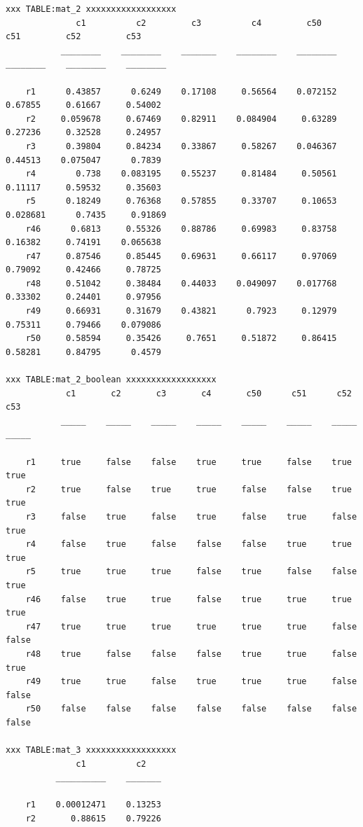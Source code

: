 \documentclass[
]{book}
\begin{document}
\begin{verbatim}
xxx TABLE:mat_2 xxxxxxxxxxxxxxxxxx
              c1          c2         c3          c4         c50         c51         c52         c53   
           ________    ________    _______    ________    ________    ________    ________    ________

    r1      0.43857      0.6249    0.17108     0.56564    0.072152     0.67855     0.61667     0.54002
    r2     0.059678     0.67469    0.82911    0.084904     0.63289     0.27236     0.32528     0.24957
    r3      0.39804     0.84234    0.33867     0.58267    0.046367     0.44513    0.075047      0.7839
    r4        0.738    0.083195    0.55237     0.81484     0.50561     0.11117     0.59532     0.35603
    r5      0.18249     0.76368    0.57855     0.33707     0.10653    0.028681      0.7435     0.91869
    r46      0.6813     0.55326    0.88786     0.69983     0.83758     0.16382     0.74191    0.065638
    r47     0.87546     0.85445    0.69631     0.66117     0.97069     0.79092     0.42466     0.78725
    r48     0.51042     0.38484    0.44033    0.049097    0.017768     0.33302     0.24401     0.97956
    r49     0.66931     0.31679    0.43821      0.7923     0.12979     0.75311     0.79466    0.079086
    r50     0.58594     0.35426     0.7651     0.51872     0.86415     0.58281     0.84795      0.4579

xxx TABLE:mat_2_boolean xxxxxxxxxxxxxxxxxx
            c1       c2       c3       c4       c50      c51      c52      c53 
           _____    _____    _____    _____    _____    _____    _____    _____

    r1     true     false    false    true     true     false    true     true 
    r2     true     false    true     true     false    false    true     true 
    r3     false    true     false    true     false    true     false    true 
    r4     false    true     false    false    false    true     true     true 
    r5     true     true     true     false    true     false    false    true 
    r46    false    true     true     false    true     true     true     true 
    r47    true     true     true     true     true     true     false    false
    r48    true     false    false    false    true     true     false    true 
    r49    true     true     false    true     true     true     false    false
    r50    false    false    false    false    false    false    false    false

xxx TABLE:mat_3 xxxxxxxxxxxxxxxxxx
              c1          c2   
          __________    _______

    r1    0.00012471    0.13253
    r2       0.88615    0.79226


\end{verbatim}
\end{document}
